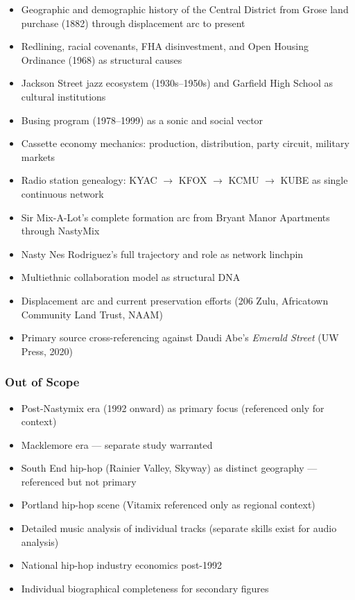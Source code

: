 \documentclass[11pt,letterpaper]{article}
\begin{document}
\begin{itemize}
  \item Geographic and demographic history of the Central District from Grose land purchase (1882) through displacement arc to present
  \item Redlining, racial covenants, FHA disinvestment, and Open Housing Ordinance (1968) as structural causes
  \item Jackson Street jazz ecosystem (1930s--1950s) and Garfield High School as cultural institutions
  \item Busing program (1978--1999) as a sonic and social vector
  \item Cassette economy mechanics: production, distribution, party circuit, military markets
  \item Radio station genealogy: KYAC $\rightarrow$ KFOX $\rightarrow$ KCMU $\rightarrow$ KUBE as single continuous network
  \item Sir Mix-A-Lot's complete formation arc from Bryant Manor Apartments through NastyMix
  \item Nasty Nes Rodriguez's full trajectory and role as network linchpin
  \item Multiethnic collaboration model as structural DNA
  \item Displacement arc and current preservation efforts (206 Zulu, Africatown Community Land Trust, NAAM)
  \item Primary source cross-referencing against Daudi Abe's \textit{Emerald Street} (UW Press, 2020)
\end{itemize}

\subsubsection{Out of Scope}

\begin{itemize}
  \item Post-Nastymix era (1992 onward) as primary focus (referenced only for context)
  \item Macklemore era --- separate study warranted
  \item South End hip-hop (Rainier Valley, Skyway) as distinct geography --- referenced but not primary
  \item Portland hip-hop scene (Vitamix referenced only as regional context)
  \item Detailed music analysis of individual tracks (separate skills exist for audio analysis)
  \item National hip-hop industry economics post-1992
  \item Individual biographical completeness for secondary figures
\end{itemize}
\end{document}

